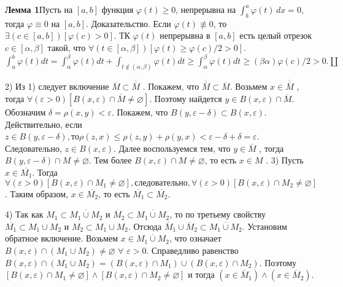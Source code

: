 
\newcommand{\br}{\geqslant}
\newcommand{\mr }{\leqslant}
\newcommand{\mes}{\{X, \rho\}}
\newcommand{\MS}{Пусть $\{X, \rho\}$~--метрическое пространство}
\newcommand{\tttk}{тогда и только тогда, когда }
\newcommand{\Rnp}{\mathbb{R}^n_p}
\newcommand{\crk}{^{\circ}}
\linespread{1.15}
\usepackage{xhfill}

\pagestyle{empty}
\footnotesize{
\textbf{Лемма 1}Пусть на $[a, b]$ функция $\varphi (t) \br 0$, непрерывна на $\int_{b}^{a}\varphi
    (t)\, dx=0$, тогда $\varphi\equiv 0$ на $[a, b]$.
Доказательство. Если $\varphi(t) \not\equiv  0$, то
$ \exists(c \in [a, b]) [\varphi(c) > 0]$.
ТК $\varphi(t)$ непрерывна в $[a, b]$ есть
целый отрезок $c\in[\alpha, \beta]$ такой, что
$\forall(t \in [\alpha, \beta])[ \varphi(t) \br \varphi(c)/2 > 0 ]$.
$\int^b_a\varphi(t) dt = \int^\beta_\alpha \varphi(t) dt+
    \int_{t\notin(\alpha,\beta)}\varphi(t) dt\br
    \int^\beta_\alpha\varphi(t) dt \br (\beta \alpha)\varphi(c)/2 > 0. \amalg$


2)	Из 1) следует включение $\overline M \subset \overline{\overline{M}}$ .
Покажем, что $\overline{\overline{M}} \subset \overline M $.
Возьмем $x \in \overline{\overline{M}}$ ,
тогда $\forall(\varepsilon > 0)[B(x, \varepsilon) \cap \overline M  \neq \varnothing]$.
Поэтому найдется $y  \in B(x, \varepsilon) \cap \overline M$.
Обозначим $\delta = \rho(x, y) < \varepsilon$.
Покажем, что $B(y, \varepsilon - \delta) \subset B(x, \varepsilon)$.
Действительно, если $z \in B(y, \varepsilon-\delta), то \rho(z, x) \mr
    \rho(z, y)+\rho(y, x) < \varepsilon- \delta+\delta = \varepsilon$.
Следовательно, $z \in B(x, \varepsilon)$.
Далее воспользуемся тем,  что  $y  \in \overline M$ ,
тогда $B(y, \varepsilon - \delta) \cap M \neq \varnothing$.
Тем более $B(x, \varepsilon) \cap M \neq \varnothing$, то есть $x \in M$ .
3)	Пусть  $x   \in  \overline{M_1}$.
Тогда  $\forall(\varepsilon   >   0)[B(x, \varepsilon)  \cap M_1   \neq   \varnothing],  следовательно,
    \forall(\varepsilon > 0)[B(x, \varepsilon) \cap M_2 \neq \varnothing]$.
Таким образом, $x \in \overline {M_2}$, то есть $\overline {M_1} \subset \overline {M_2}$.

4)	Так как $M_1 \subset \overline{M_1 \cup M_2}$  и $\overline M_2
    \subset \overline{M_1 \cup M_2}$,
то по третьему свойству
$\overline{M_1 }\subset M_1 \cup M_2$ и $M_2 \subset M_1 \cup M_2$.
Отсюда $\overline M_1 \cup \overline M_2 \subset \overline{M_1 \cup M_2}$.
Установим обратное включение.
Возьмем $x \in\overline{ M_1 \cup M_2}$, что означает
$B(x, \varepsilon) \cap (M_1 \cup M_2) \neq	\varnothing$ $\forall$ $\varepsilon > 0$.
Справедливо равенство
$B(x, \varepsilon) \cap (M_1 \cup M_2) =
    (B(x, \varepsilon) \cap M_1) \cup (B(x, \varepsilon) \cap M_2)$.
Поэтому $[B(x, \varepsilon) \cap M_1 \neq \varnothing]
    \wedge [B(x, \varepsilon) \cap M_2 \neq \varnothing] $
и тогда $(x \in \overline M_1) \wedge (x \in \overline M_2)$.

}
